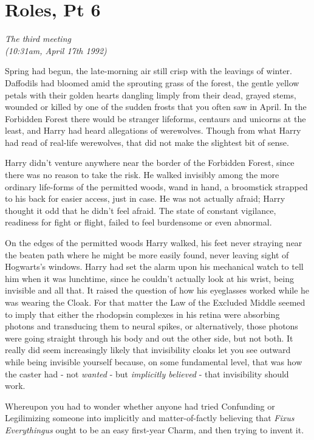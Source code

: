 \chapter{Roles, Pt 6}\label{roles-pt-6}

\emph{The third meeting\\ (10:31am, April 17th 1992)}

Spring had begun, the late-morning air still crisp with the leavings of
winter. Daffodils had bloomed amid the sprouting grass of the forest,
the gentle yellow petals with their golden hearts dangling limply from
their dead, grayed stems, wounded or killed by one of the sudden frosts
that you often saw in April. In the Forbidden Forest there would be
stranger lifeforms, centaurs and unicorns at the least, and Harry had
heard allegations of werewolves. Though from what Harry had read of
real-life werewolves, that did not make the slightest bit of sense.

Harry didn't venture anywhere near the border of the Forbidden Forest,
since there was no reason to take the risk. He walked invisibly among
the more ordinary life-forms of the permitted woods, wand in hand, a
broomstick strapped to his back for easier access, just in case. He was
not actually afraid; Harry thought it odd that he didn't feel afraid.
The state of constant vigilance, readiness for fight or flight, failed
to feel burdensome or even abnormal.

On the edges of the permitted woods Harry walked, his feet never
straying near the beaten path where he might be more easily found, never
leaving sight of Hogwarts's windows. Harry had set the alarm upon his
mechanical watch to tell him when it was lunchtime, since he couldn't
actually look at his wrist, being invisible and all that. It raised the
question of how his eyeglasses worked while he was wearing the Cloak.
For that matter the Law of the Excluded Middle seemed to imply that
either the rhodopsin complexes in his retina were absorbing photons and
transducing them to neural spikes, or alternatively, those photons were
going straight through his body and out the other side, but not both. It
really did seem increasingly likely that invisibility cloaks let you see
outward while being invisible yourself because, on some fundamental
level, that was how the caster had - not \emph{wanted} - but
\emph{implicitly believed} - that invisibility should work.

Whereupon you had to wonder whether anyone had tried Confunding or
Legilimizing someone into implicitly and matter-of-factly believing that
\emph{Fixus Everythingus} ought to be an easy first-year Charm, and then
trying to invent it.

